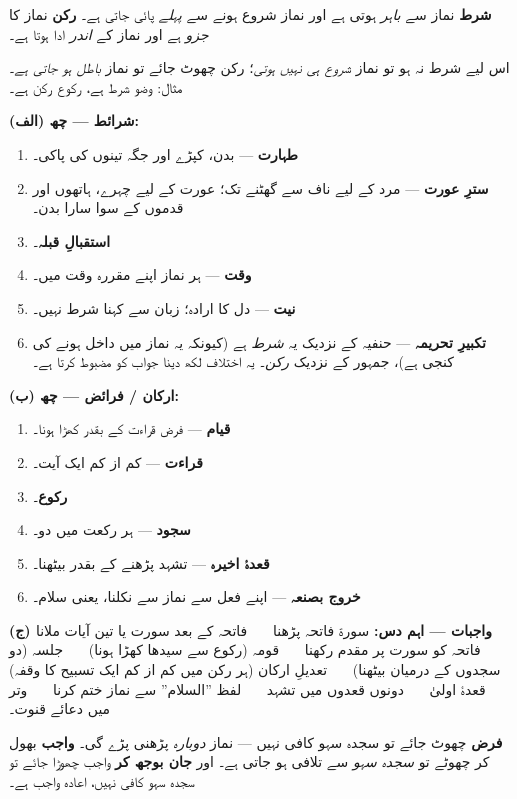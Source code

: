 \begin{hal}
\begin{nukta}
\textbf{شرط} نماز سے \emph{باہر} ہوتی ہے اور نماز شروع ہونے سے \emph{پہلے}
پائی جاتی ہے۔ \textbf{رکن} نماز کا \emph{جزو} ہے اور نماز کے \emph{اندر} ادا
ہوتا ہے۔

\smallskip
اس لیے شرط نہ ہو تو نماز \emph{شروع ہی نہیں ہوتی}؛ رکن چھوٹ جائے تو نماز
\emph{باطل ہو جاتی ہے}۔ مثال: وضو شرط ہے، رکوع رکن ہے۔
\end{nukta}

\medskip
\textbf{(الف) شرائط --- چھ:}
\begin{enumerate}\setlength{\itemsep}{1pt}
  \item \textbf{طہارت} --- بدن، کپڑے اور جگہ تینوں کی پاکی۔
  \item \textbf{سترِ عورت} --- مرد کے لیے ناف سے گھٹنے تک؛ عورت کے لیے چہرے،
        ہاتھوں اور قدموں کے سوا سارا بدن۔
  \item \textbf{استقبالِ قبلہ}۔
  \item \textbf{وقت} --- ہر نماز اپنے مقررہ وقت میں۔
  \item \textbf{نیت} --- دل کا ارادہ؛ زبان سے کہنا شرط نہیں۔
  \item \textbf{تکبیرِ تحریمہ} --- حنفیہ کے نزدیک یہ \emph{شرط} ہے (کیونکہ یہ
        نماز میں داخل ہونے کی کنجی ہے)، جمہور کے نزدیک \emph{رکن}۔ یہ اختلاف
        لکھ دینا جواب کو مضبوط کرتا ہے۔
\end{enumerate}

\medskip
\textbf{(ب) ارکان / فرائض --- چھ:}
\begin{enumerate}\setlength{\itemsep}{1pt}
  \item \textbf{قیام} --- فرض قراءت کے بقدر کھڑا ہونا۔
  \item \textbf{قراءت} --- کم از کم ایک آیت۔
  \item \textbf{رکوع}۔
  \item \textbf{سجود} --- ہر رکعت میں دو۔
  \item \textbf{قعدۂ اخیرہ} --- تشہد پڑھنے کے بقدر بیٹھنا۔
  \item \textbf{خروج بصنعہ} --- اپنے فعل سے نماز سے نکلنا، یعنی سلام۔
\end{enumerate}

\medskip
\textbf{(ج) واجبات --- اہم دس:} سورۃ فاتحہ پڑھنا \ \textbullet\ \ فاتحہ کے بعد
سورت یا تین آیات ملانا \ \textbullet\ \ فاتحہ کو سورت پر مقدم رکھنا \
\textbullet\ \ قومہ (رکوع سے سیدھا کھڑا ہونا) \ \textbullet\ \ جلسہ (دو سجدوں
کے درمیان بیٹھنا) \ \textbullet\ \ تعدیلِ ارکان (ہر رکن میں کم از کم ایک تسبیح
کا وقفہ) \ \textbullet\ \ قعدۂ اولیٰ \ \textbullet\ \ دونوں قعدوں میں تشہد \
\textbullet\ \ لفظ ''السلام'' سے نماز ختم کرنا \ \textbullet\ \ وتر میں دعائے
قنوت۔

\medskip
\begin{ghalti}
\textbf{فرض} چھوٹ جائے تو سجدہ سہو کافی نہیں --- نماز \emph{دوبارہ} پڑھنی پڑے
گی۔ \textbf{واجب} بھول کر چھوٹے تو \emph{سجدہ سہو} سے تلافی ہو جاتی ہے۔ اور
\textbf{جان بوجھ کر} واجب چھوڑا جائے تو سجدہ سہو کافی نہیں، اعادہ واجب ہے۔
\end{ghalti}
\end{hal}

